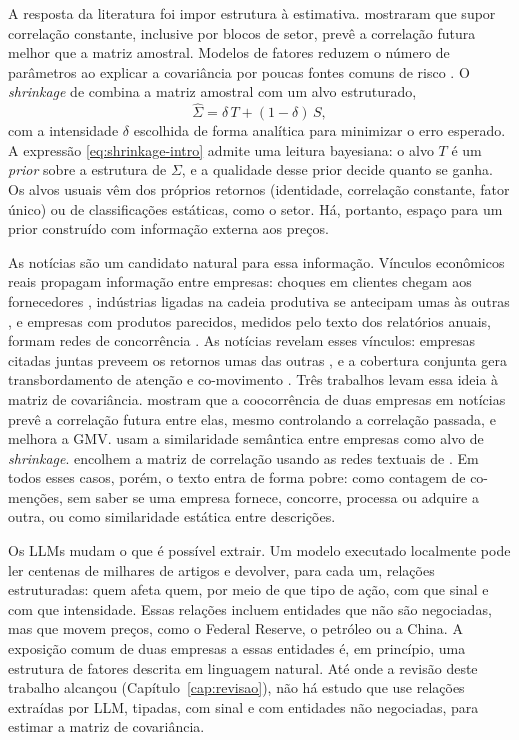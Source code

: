 A resposta da literatura foi impor estrutura à estimativa. \citet{elton1973} mostraram que supor
correlação constante, inclusive por blocos de setor, prevê a correlação futura melhor que a matriz
amostral. Modelos de fatores reduzem o número de parâmetros ao explicar a covariância por poucas
fontes comuns de risco \citep{chan1999}. O \emph{shrinkage} de \citet{ledoit2003,ledoit2004honey,ledoit2004jmva}
combina a matriz amostral com um alvo estruturado,
\begin{equation}
  \hat\Sigma = \delta\,T + (1-\delta)\,S,
  \label{eq:shrinkage-intro}
\end{equation}
com a intensidade $\delta$ escolhida de forma analítica para minimizar o erro esperado. A expressão
\eqref{eq:shrinkage-intro} admite uma leitura bayesiana: o alvo $T$ é um \emph{prior} sobre a estrutura
de $\Sigma$, e a qualidade desse prior decide quanto se ganha. Os alvos usuais vêm dos próprios
retornos (identidade, correlação constante, fator único) ou de classificações estáticas, como o setor.
Há, portanto, espaço para um prior construído com informação externa aos preços.

As notícias são um candidato natural para essa informação. Vínculos econômicos reais propagam
informação entre empresas: choques em clientes chegam aos fornecedores \citep{cohen2008}, indústrias
ligadas na cadeia produtiva se antecipam umas às outras \citep{menzly2010}, e empresas com produtos
parecidos, medidos pelo texto dos relatórios anuais, formam redes de concorrência \citep{hoberg2016}.
As notícias revelam esses vínculos: empresas citadas juntas preveem os retornos umas das outras
\citep{scherbina2020}, e a cobertura conjunta gera transbordamento de atenção e co-movimento
\citep{guo2017}. Três trabalhos levam essa ideia à matriz de covariância. \citet{tang2019} mostram que a
coocorrência de duas empresas em notícias prevê a correlação futura entre elas, mesmo controlando a
correlação passada, e melhora a GMV. \citet{becquin2023} usam a similaridade semântica entre empresas
como alvo de \emph{shrinkage}. \citet{lu2024} encolhem a matriz de correlação usando as redes textuais
de \citet{hoberg2016}. Em todos esses casos, porém, o texto entra de forma pobre: como contagem de
co-menções, sem saber se uma empresa fornece, concorre, processa ou adquire a outra, ou como
similaridade estática entre descrições.

Os LLMs mudam o que é possível extrair. Um modelo executado localmente pode ler centenas de milhares
de artigos e devolver, para cada um, relações estruturadas: quem afeta quem, por meio de que tipo de
ação, com que sinal e com que intensidade. Essas relações incluem entidades que não são negociadas,
mas que movem preços, como o Federal Reserve, o petróleo ou a China. A exposição comum de duas empresas
a essas entidades é, em princípio, uma estrutura de fatores descrita em linguagem natural. Até onde a
revisão deste trabalho alcançou (Capítulo~\ref{cap:revisao}), não há estudo que use relações extraídas
por LLM, tipadas, com sinal e com entidades não negociadas, para estimar a matriz de covariância.

